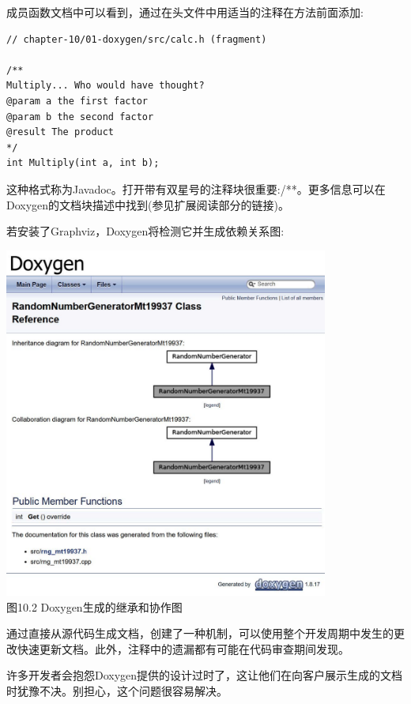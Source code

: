 成员函数文档中可以看到，通过在头文件中用适当的注释在方法前面添加:

\begin{lstlisting}[style=styleCXX]
// chapter-10/01-doxygen/src/calc.h (fragment)

/**
Multiply... Who would have thought?
@param a the first factor
@param b the second factor
@result The product
*/
int Multiply(int a, int b);
\end{lstlisting}

这种格式称为Javadoc。打开带有双星号的注释块很重要:/**。更多信息可以在Doxygen的文档块描述中找到(参见扩展阅读部分的链接)。

若安装了Graphviz，Doxygen将检测它并生成依赖关系图:

\begin{center}
\includegraphics[width=0.8\textwidth]{content/3/chapter10/images/2.jpg}\\
图10.2 Doxygen生成的继承和协作图
\end{center}

通过直接从源代码生成文档，创建了一种机制，可以使用整个开发周期中发生的更改快速更新文档。此外，注释中的遗漏都有可能在代码审查期间发现。

许多开发者会抱怨Doxygen提供的设计过时了，这让他们在向客户展示生成的文档时犹豫不决。别担心，这个问题很容易解决。









